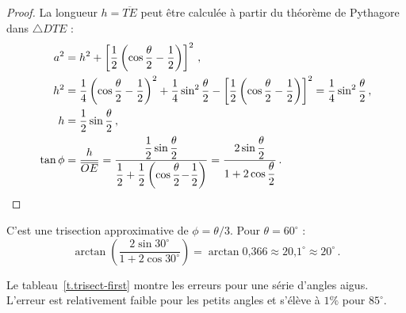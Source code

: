 \begin{proof}
La longueur $h=\overline{TE}$ peut être calculée à partir du théorème de Pythagore dans $\triangle DTE$ :
\begin{align*}
a^2 &= h^2 + \left[\frac{1}{2}\left(\cos \frac{\theta}{2}-\frac{1}{2}\right)\right]^2\,,\\
h^2&=\frac{1}{4}\left(\cos \frac{\theta}{2}-\frac{1}{2}\right)^2+\frac{1}{4}\sin^2\frac{\theta}{2}-\left[\frac{1}{2}\left(\cos \frac{\theta}{2}-\frac{1}{2}\right)\right]^2=
\frac{1}{4}\sin^2\frac{\theta}{2}\,,\\
h&=\frac{1}{2}\sin\frac{\theta}{2}\,,\\
\tan\phi &=\frac{h}{\overline{OE}}=\displaystyle\frac{\displaystyle\frac{1}{2}\sin\frac{\theta}{2}}{\displaystyle\frac{1}{2}+\frac{1}{2}\left(\cos \frac{\theta}{2}\! -\! \frac{1}{2}\right)}
=\frac{\displaystyle2\sin\frac{\theta}{2}}{\displaystyle 1+2\cos\frac{\theta}{2}}\,.\qedhere
\end{align*}                  
\end{proof}

C'est une trisection approximative de $\phi=\theta/3$. Pour $\theta=60^\circ$ :
\[
\arctan\left(\frac{2\sin 30^\circ}{1+2\cos 30^\circ}\right)=
\arctan\mbox{0,366}\approx \mbox{20,1}^\circ\approx 20^\circ\,.
\]

Le tableau~\ref{t.trisect-first} montre les erreurs pour une série d'angles aigus. L'erreur est relativement faible pour les petits angles et s'élève à $1\%$ pour  $85^\circ$.

